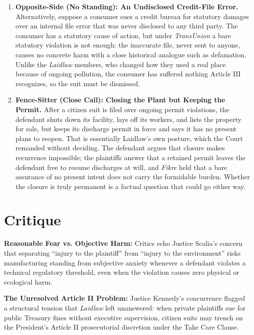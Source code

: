 \documentclass[12pt]{article}
\begin{document}
\begin{enumerate}
\item \textbf{Opposite-Side (No Standing): An Undisclosed Credit-File Error.} Alternatively, suppose a consumer sues a credit bureau for statutory damages over an internal file error that was never disclosed to any third party. The consumer has a statutory cause of action, but under \textit{TransUnion} a bare statutory violation is not enough: the inaccurate file, never sent to anyone, causes no concrete harm with a close historical analogue such as defamation. Unlike the \textit{Laidlaw} members, who changed how they used a real place because of ongoing pollution, the consumer has suffered nothing Article III recognizes, so the suit must be dismissed.

\item \textbf{Fence-Sitter (Close Call): Closing the Plant but Keeping the Permit.} After a citizen suit is filed over ongoing permit violations, the defendant shuts down its facility, lays off its workers, and lists the property for sale, but keeps its discharge permit in force and says it has no present plans to reopen. That is essentially Laidlaw's own posture, which the Court remanded without deciding. The defendant argues that closure makes recurrence impossible; the plaintiffs answer that a retained permit leaves the defendant free to resume discharges at will, and \textit{Fikre} held that a bare assurance of no present intent does not carry the formidable burden. Whether the closure is truly permanent is a factual question that could go either way.

\end{enumerate}

\section{Critique}
\textbf{Reasonable Fear vs. Objective Harm:} Critics echo Justice Scalia's concern that separating ``injury to the plaintiff'' from ``injury to the environment'' risks manufacturing standing from subjective anxiety whenever a defendant violates a technical regulatory threshold, even when the violation causes zero physical or ecological harm.

\textbf{The Unresolved Article II Problem:} Justice Kennedy's concurrence flagged a structural tension that \textit{Laidlaw} left unanswered: when private plaintiffs sue for public Treasury fines without executive supervision, citizen suits may trench on the President's Article II prosecutorial discretion under the Take Care Clause.
\end{document}
